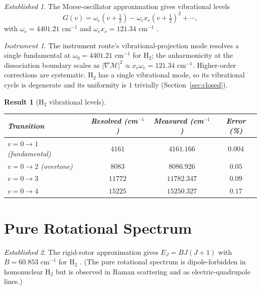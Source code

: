 \documentclass[11pt,a4paper]{article}
\theoremstyle{stmtstyle}
\newtheorem{result}{Result}
\theoremstyle{definition}
\theoremstyle{remark}
\newtheorem*{established}{Established}
\newtheorem*{instrument}{Instrument}
\newcommand{\Depth}{\mathcal{M}}
\begin{document}
\begin{established}
The Morse-oscillator approximation \citep{wilsondeciuscross1955} gives vibrational levels
\begin{equation}
G(v) = \omega_{e}(v + \tfrac{1}{2}) - \omega_{e} x_{e}(v + \tfrac{1}{2})^{2} + \cdots,
\end{equation}
with $\omega_{e} = 4401.21$ cm$^{-1}$ and $\omega_{e} x_{e} = 121.34$ cm$^{-1}$ \citep{huberHerzberg1979}.
\end{established}

\begin{instrument}
The instrument route’s vibrational-projection mode resolves a single fundamental at $\omega_{0} = 4401.21$ cm$^{-1}$ for H$_{2}$; the anharmonicity at the dissociation boundary scales as $|\nabla\Depth|^{2} \propto x_{e}\omega_{e} = 121.34$ cm$^{-1}$. Higher-order corrections are systematic. H$_{2}$ has a single vibrational mode, so its vibrational cycle is degenerate and its uniformity is $1$ trivially (Section~\ref{sec:closed}).
\end{instrument}

\begin{result}[H$_{2}$ vibrational levels]\label{res:h2vib}
\begin{center}\small
\begin{tabular}{lccc}
\toprule
Transition & Resolved (cm$^{-1}$) & Measured (cm$^{-1}$) & Error (\%)\\
\midrule
$v=0\to 1$ (fundamental) & $4161$ & $4161.166$ & $0.004$\\
$v=0\to 2$ (overtone)    & $8083$ & $8086.926$ & $0.05$\\
$v=0\to 3$               & $11772$& $11782.347$& $0.09$\\
$v=0\to 4$               & $15225$& $15250.327$& $0.17$\\
\bottomrule
\end{tabular}
\end{center}
\end{result}

\section{Pure Rotational Spectrum}
\label{sec:h2rot}

\begin{established}
The rigid-rotor approximation gives $E_{J} = BJ(J+1)$ with $B = 60.853$ cm$^{-1}$ for H$_{2}$ \citep{stoicheff1957}. (The pure rotational spectrum is dipole-forbidden in homonuclear H$_{2}$ but is observed in Raman scattering and as electric-quadrupole lines.)
\end{established}
\end{document}
